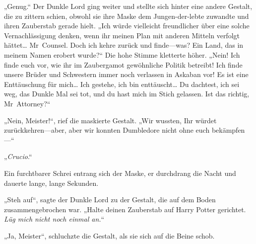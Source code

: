 „Genug.“ Der Dunkle Lord ging weiter und stellte sich hinter eine andere Gestalt, die zu zittern schien, obwohl sie ihre Maske dem Jungen-der-lebte zuwandte und ihren Zauberstab gerade hielt.
„Ich würde vielleicht freundlicher über eine solche Vernachlässigung denken, wenn ihr meinen Plan mit anderen Mitteln verfolgt hättet… Mr~Counsel. Doch ich kehre zurück und finde—was? Ein Land, das in meinem Namen erobert wurde?“
Die hohe Stimme kletterte höher.
„Nein! Ich finde euch vor, wie ihr im Zaubergamot gewöhnliche Politik betreibt! Ich finde unsere Brüder und Schwestern immer noch verlassen in Askaban vor! Es ist eine Enttäuschung für mich… Ich gestehe, ich bin enttäuscht… Du dachtest, ich sei weg, das Dunkle Mal sei tot, und du hast mich im Stich gelassen. Ist das richtig, Mr~Attorney?“

„Nein, Meister!“, rief die maskierte Gestalt. „Wir wussten, Ihr würdet zurückkehren—aber, aber wir konnten Dumbledore nicht ohne euch bekämpfen—“

„\emph{Crucio}.“

Ein furchtbarer Schrei entrang sich der Maske, er durchdrang die Nacht und dauerte lange, lange Sekunden.

„Steh auf“, sagte der Dunkle Lord zu der Gestalt, die auf dem Boden zusammengebrochen war. „Halte deinen Zauberstab auf Harry Potter gerichtet. \emph{Lüg mich nicht noch einmal an.}“

„Ja, Meister“, schluchzte die Gestalt, als sie sich auf die Beine schob.

